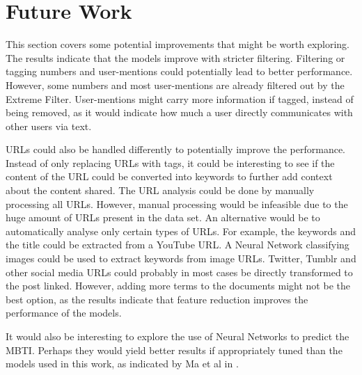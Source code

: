 \section{Future Work}

This section covers some potential improvements that might be worth exploring.
The results indicate that the models improve with stricter filtering.
Filtering or tagging numbers and user-mentions could potentially lead to better performance.
However, some numbers and most user-mentions are already filtered out by the Extreme Filter.
User-mentions might carry more information if tagged, instead of being removed, as it would indicate how much a user directly communicates with other users via text.

URLs could also be handled differently to potentially improve the performance.
Instead of only replacing URLs with tags, it could be interesting to see if the content of the URL could be converted into keywords to further add context about the content shared.
The URL analysis could be done by manually processing all URLs.
However, manual processing would be infeasible due to the huge amount of URLs present in the data set.
An alternative would be to automatically analyse only certain types of URLs.
For example, the keywords and the title could be extracted from a YouTube URL.
A Neural Network classifying images could be used to extract keywords from image URLs.
Twitter, Tumblr and other social media URLs could probably in most cases be directly transformed to the post linked.
However, adding more terms to the documents might not be the best option, as the results indicate that feature reduction improves the performance of the models. 

It would also be interesting to explore the use of Neural Networks to predict the MBTI.
Perhaps they would yield better results if appropriately tuned than the models used in this work, as indicated by Ma et al in \cite{maneural}.